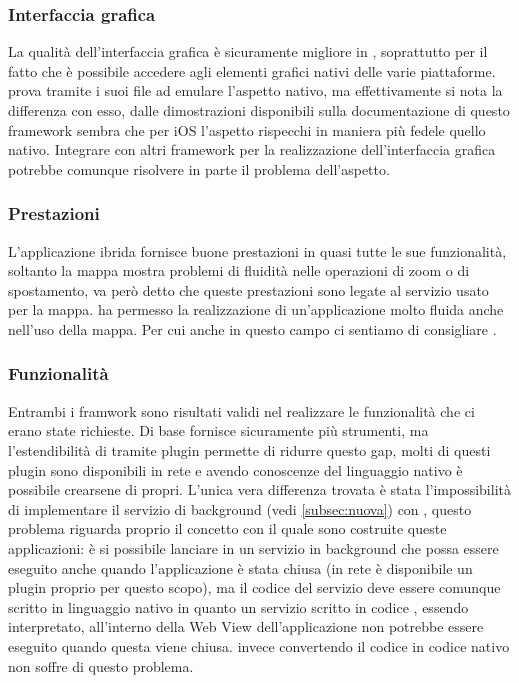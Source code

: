 		\subsubsection{Interfaccia grafica}
		La qualità dell'interfaccia grafica è sicuramente migliore in \tisdk{},
		soprattutto per il fatto che è possibile accedere agli elementi 
		grafici nativi delle varie piattaforme. \kendomob{} prova tramite i 
		suoi file \css{} ad emulare l'aspetto nativo, ma effettivamente si nota 
		la differenza con esso, dalle dimostrazioni disponibili sulla 
		documentazione di questo framework sembra che per iOS l'aspetto 
		rispecchi in maniera più fedele quello nativo. Integrare \pg{} con 
		altri framework per la realizzazione dell'interfaccia grafica potrebbe 
		comunque risolvere in parte il problema dell'aspetto.
		\subsubsection{Prestazioni} 
		L'applicazione ibrida fornisce buone prestazioni in quasi tutte 
		le sue funzionalità, soltanto la mappa mostra problemi di fluidità 
		nelle operazioni di zoom o di spostamento, va però detto che queste 
		prestazioni sono legate al servizio usato per la mappa.
		\tisdk{} ha permesso la realizzazione di un'applicazione molto fluida 
		anche nell'uso della mappa. Per cui anche in questo campo ci sentiamo 
		di consigliare \tisdk{}.
		\subsubsection{Funzionalità}
		Entrambi i framwork sono risultati validi nel realizzare le 
		funzionalità che ci erano state richieste. Di base \tisdk{} fornisce 
		sicuramente più strumenti, ma l'estendibilità di \pg{} tramite plugin 
		permette di ridurre questo gap, molti di questi plugin sono 
		disponibili in rete e avendo conoscenze del linguaggio nativo è 
		possibile crearsene di propri. L'unica vera differenza 
		trovata è stata l'impossibilità di implementare il servizio di 
		background (vedi \ref{subsec:nuova}) con \pg{}, questo problema 
		riguarda proprio il concetto con 
		il quale sono costruite queste applicazioni: è si possibile lanciare 
		in \js{}
		un servizio in background che possa essere eseguito anche quando 
		l'applicazione è stata chiusa (in rete è disponibile un plugin proprio 
		per questo scopo), ma il codice del servizio deve essere comunque 
		scritto in linguaggio nativo in quanto un servizio scritto in codice 
		\js{}, essendo interpretato, all'interno della Web View  
		dell'applicazione non potrebbe essere eseguito quando questa viene 
		chiusa.
		\tisdk{} invece convertendo il codice \js{} in codice nativo non 
		soffre di questo problema.
